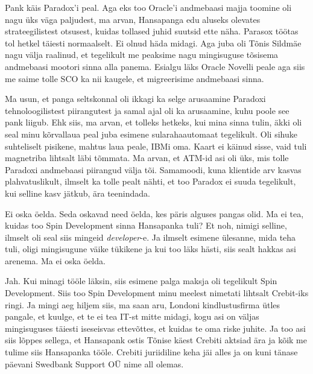 
Pank käis Paradox'i peal. Aga eks too Oracle'i andmebaasi majja toomine oli nagu üks väga paljudest, ma arvan,  Hansapanga edu aluseks olevates strateegilistest otsusest, kuidas tollased juhid suutsid ette näha. Parasox töötas tol hetkel täiesti normaalselt. Ei olnud häda midagi. Aga juba oli Tõnis Sildmäe nagu välja raalinud, et tegelikult me peaksime nagu mingisuguse tõsisema andmebaasi mootori sinna alla panema. Esialgu läks Oracle Novelli peale  aga siis me saime tolle SCO ka nii kaugele, et migreerisime andmebaasi sinna.


Ma usun,  et panga seltskonnal oli ikkagi ka selge arusaamine Paradoxi tehnoloogilistest piirangutest ja samal ajal oli ka arusaamine, kuhu poole see pank liigub. Ehk siis, ma arvan, et tolleks hetkeks, kui mina sinna tulin, äkki oli seal minu kõrvallaua peal juba esimene sularahaautomaat tegelikult.  Oli sihuke suhteliselt pisikene,  mahtus laua peale, IBMi oma. Kaart ei käinud sisse, vaid tuli magnetriba lihtsalt läbi tõmmata. Ma arvan, et ATM-id asi oli üks, mis  tolle Paradoxi andmebaasi piirangud välja tõi. Samamoodi, kuna klientide arv kasvas plahvatuslikult, ilmselt ka tolle pealt nähti, et too Paradox ei suuda tegelikult, kui selline kasv jätkub, ära teenindada.


Ei oska öelda. Seda oskavad need öelda, kes päris alguses pangas olid. Ma ei tea, kuidas too Spin Development sinna Hansapanka tuli? Et noh, nimigi selline,  ilmselt oli seal siis mingeid \emph{developer}-e. Ja ilmselt esimene ülesanne, mida teha tuli, oligi mingisugune väike tükikene ja kui too läks hästi, siis sealt hakkas asi arenema. Ma ei oska öelda.


Jah. Kui minagi tööle läksin, siis esimene palga maksja oli tegelikult Spin Development. Siis too Spin Development minu meelest nimetati lihtsalt Crebit-iks ringi. Ja mingi aeg hiljem siis, ma saan aru, Londoni kindlustusfirma ütles pangale, et kuulge, et te ei tea IT-st mitte midagi, kogu asi on väljas mingisuguses täiesti iseseisvas ettevõttes, et kuidas te oma riske juhite. Ja too asi siis lõppes sellega, et Hansapank ostis Tõnise käest Crebiti aktsiad ära ja kõik me tulime siis Hansapanka tööle. Crebiti juriidiline keha jäi alles ja on kuni tänase päevani Swedbank Support OÜ nime all olemas.

